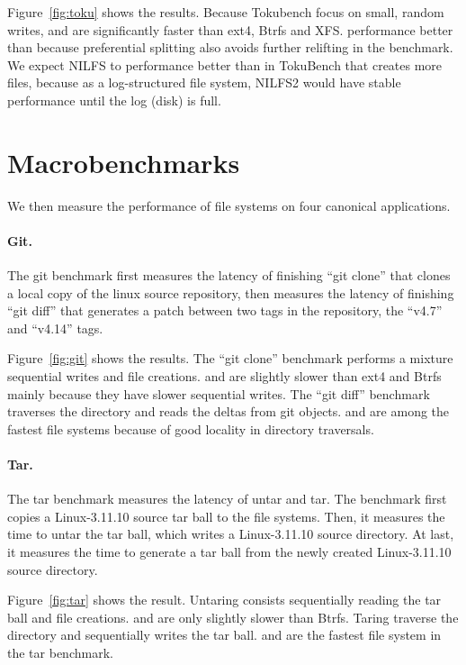 Figure~\ref{fig:toku} shows the results.
Because Tokubench focus on small, random writes, \betrfsFour and \betrfsFive are
significantly faster than ext4, Btrfs and XFS.
\betrfsFive performance better than \betrfsFour because preferential splitting
also avoids further relifting in the benchmark.
We expect NILFS to performance better than \betrfsFive in TokuBench that creates
more files,
because as a log-structured file system, NILFS2 would have stable performance
until the log (disk) is full.

\section{Macrobenchmarks}

We then measure the performance of file systems on four canonical applications.

\paragraph{Git.}

The git benchmark first measures the latency of finishing ``git clone'' that
clones a local copy of the linux source repository,
then measures the latency of finishing ``git diff'' that generates a patch
between two tags in the repository, the ``v4.7'' and ``v4.14'' tags.

Figure~\ref{fig:git} shows the results.
The ``git clone'' benchmark performs a mixture sequential writes and file
creations.
\betrfsFour and \betrfsFive are slightly slower than ext4 and Btrfs mainly
because they have slower sequential writes.
The ``git diff'' benchmark traverses the directory and reads the deltas from git
objects.
\betrfsFour and \betrfsFive are among the fastest file systems because of good
locality in directory traversals.

\paragraph{Tar.}

The tar benchmark measures the latency of untar and tar.
The benchmark first copies a Linux-3.11.10 source tar ball to the file systems.
Then, it measures the time to untar the tar ball, which writes a Linux-3.11.10
source directory.
At last, it measures the time to generate a tar ball from the newly created
Linux-3.11.10 source directory.

Figure~\ref{fig:tar} shows the result.
Untaring consists sequentially reading the tar ball and file creations.
\betrfsFour and \betrfsFive are only slightly slower than Btrfs.
Taring traverse the directory and sequentially writes the tar ball.
\betrfsFour and \betrfsFive are the fastest file system in the tar benchmark.

